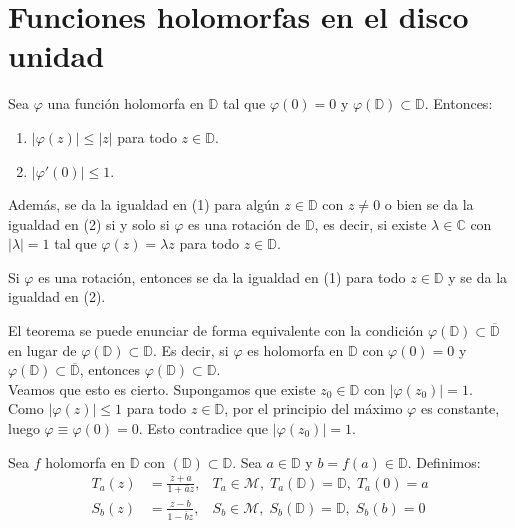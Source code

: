 \section{Funciones holomorfas en el disco unidad}
\begin{theorem}
    Sea $\varphi$ una función holomorfa en $\mathbb{D}$ tal que $\varphi(0) = 0$ y $\varphi(\mathbb{D}) \subset \mathbb{D}$.
    Entonces:
    \begin{enumerate}
        \item $|\varphi(z)| \leq |z|$ para todo $z \in \mathbb{D}$.
        \item $|\varphi'(0)| \leq 1$.
    \end{enumerate}

    Además, se da la igualdad en (1) para algún $z \in \mathbb{D}$ con $z \neq 0$ o bien se da la igualdad en (2) si y solo si $\varphi$ es una rotación de $\mathbb{D}$, es decir, si existe $\lambda \in \mathbb{C}$ con $|\lambda| = 1$ tal que $\varphi(z) = \lambda z$ para todo $z \in \mathbb{D}$.
\end{theorem}

\begin{remark}
    Si $\varphi$ es una rotación, entonces se da la igualdad en (1) para todo $z \in \mathbb{D}$ y se da la igualdad en (2).
\end{remark}

\begin{remark}
    El teorema se puede enunciar de forma equivalente con la condición $\varphi(\mathbb{D}) \subset \overline{\mathbb{D}}$ en lugar de $\varphi(\mathbb{D}) \subset \mathbb{D}$.
    Es decir, si $\varphi$ es holomorfa en $\mathbb{D}$ con $\varphi(0) = 0$ y $\varphi(\mathbb{D}) \subset \overline{\mathbb{D}}$, entonces $\varphi(\mathbb{D}) \subset \mathbb{D}$. \\
    Veamos que esto es cierto.
    Supongamos que existe $z_0 \in \mathbb{D}$ con $|\varphi(z_0)| = 1$.
    Como $|\varphi(z)| \leq 1$ para todo $z \in \mathbb{D}$, por el principio del máximo $\varphi$ es constante, luego $\varphi \equiv \varphi(0) = 0$.
    Esto contradice que $|\varphi(z_0)| = 1$.
\end{remark}

Sea $f$ holomorfa en $\mathbb{D}$ con $(\mathbb{D}) \subset \mathbb{D}$.
Sea $a \in \mathbb{D}$ y $b = f(a) \in \mathbb{D}$.
Definimos:
\begin{align*}
    T_a(z) & = \frac{z+a}{1 + \bar{a}z}, & T_a \in \mathcal{M}, \; T_a(\mathbb{D}) = \mathbb{D}, \; T_a(0) = a \\
    S_b(z) & = \frac{z-b}{1 - \bar{b}z}, & S_b \in \mathcal{M}, \; S_b(\mathbb{D}) = \mathbb{D}, \; S_b(b) = 0
\end{align*}

